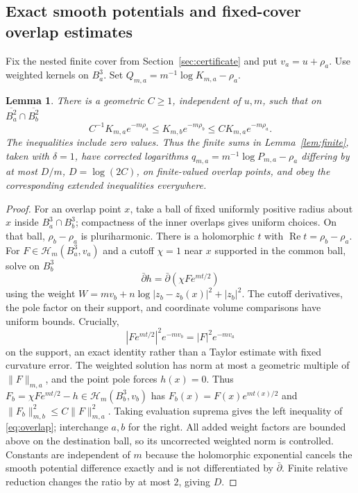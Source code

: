 \documentclass[11pt]{article}
\newtheorem{lemma}[theorem]{Lemma}
\theoremstyle{definition}
\begin{document}
\subsection{Exact smooth potentials and fixed-cover overlap estimates}
Fix the nested finite cover from Section~\ref{sec:certificate} and
put $v_a=u+\rho_a$. Use weighted kernels on $B_a^3$.
Set $Q_{m,a}=m^{-1}\log K_{m,a}-\rho_a$.
\begin{lemma}\label{lem:overlap}
There is a geometric $C\geq1$, independent of $u,m$, such that
on $\overline{B_a^2}\cap\overline{B_b^2}$
\begin{equation}\label{eq:overlap}
 C^{-1}K_{m,a}e^{-m\rho_a}
 \leq K_{m,b}e^{-m\rho_b}
 \leq C K_{m,a}e^{-m\rho_a}.
\end{equation}
The inequalities include zero values. Thus the finite sums in
Lemma~\ref{lem:finite}, taken with $\delta=1$, have corrected
logarithms $q_{m,a}=m^{-1}\log P_{m,a}-\rho_a$ differing by at
most $D/m$, $D=\log(2C)$, on finite-valued overlap points, and
obey the corresponding extended inequalities everywhere.
\end{lemma}
\begin{proof}
For an overlap point $x$, take a ball of fixed uniformly positive
radius about $x$ inside $B_a^3\cap B_b^3$; compactness of the
inner overlaps gives uniform choices. On that ball,
$\rho_b-\rho_a$ is pluriharmonic. There is a holomorphic $t$
with $\operatorname{Re}t=\rho_b-\rho_a$.
For $F\in\mathcal H_m(B_a^3,v_a)$ and a cutoff $\chi=1$ near
$x$ supported in the common ball, solve on $B_b^3$
\[
 \bar\partial h=\bar\partial(\chi F e^{mt/2})
\]
using the weight
$W=mv_b+n\log|z_b-z_b(x)|^2+|z_b|^2$.
The cutoff derivatives, the pole factor on their support, and
coordinate volume comparisons have uniform bounds. Crucially,
\[
 |F e^{mt/2}|^2 e^{-mv_b}=|F|^2e^{-mv_a}
\]
on the support, an exact identity rather than a Taylor estimate
with fixed curvature error. The weighted solution has norm at
most a geometric multiple of $\|F\|_{m,a}$, and the point pole
forces $h(x)=0$. Thus
$F_b=\chi Fe^{mt/2}-h\in\mathcal H_m(B_b^3,v_b)$ has
$F_b(x)=F(x)e^{mt(x)/2}$ and
$\|F_b\|_{m,b}^2\leq C\|F\|_{m,a}^2$.
Taking evaluation suprema gives the left inequality of
\eqref{eq:overlap}; interchange $a,b$ for the right. All added
weight factors are bounded above on the destination ball, so its
uncorrected weighted norm is controlled. Constants are independent
of $m$ because the holomorphic exponential cancels the smooth
potential difference exactly and is not differentiated by
$\bar\partial$. Finite relative reduction changes the ratio by
at most $2$, giving $D$.
\end{proof}
\end{document}
